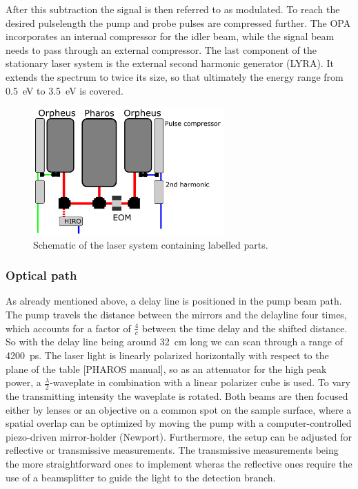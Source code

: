 After this subtraction the signal is then referred to as modulated.
To reach the desired pulselength the pump and probe pulses are compressed further.
The OPA incorporates an internal compressor for the idler beam, while the signal beam needs to pass through an external compressor.
The last component of the stationary laser system is the external second harmonic generator (LYRA).
It extends the spectrum to twice its size, so that ultimately the energy range from \qty{0.5}{eV} to \qty{3.5}{eV} is covered. 
\begin{figure}[ht]
    \centering
    \includegraphics[width=0.65\textwidth]{pictures/laser_system.png}
    \caption{Schematic of the laser system containing labelled parts.}
    \label{fig:laser_systems}
\end{figure}

\subsubsection*{Optical path}
As already mentioned above, a delay line is positioned in the pump beam path.
The pump travels the distance between the mirrors and the delayline four times, which accounts for a factor of $\frac{4}{c}$ between the time delay and the shifted distance.
So with the delay line being around \qty{32}{cm} long we can scan through a range of \qty{4200}{ps}.
The laser light is linearly polarized horizontally with respect to the plane of the table [PHAROS manual], so as an attenuator for the high peak power, a $\frac{\lambda}{2}$-waveplate in combination with a linear polarizer cube is used.
To vary the transmitting intensity the waveplate is rotated.
Both beams are then focused either by lenses or an objective on a common spot on the sample surface, where a spatial overlap can be optimized by moving the pump with a computer-controlled piezo-driven mirror-holder (Newport).
Furthermore, the setup can be adjusted for reflective or transmissive measurements.
The transmissive measurements being the more straightforward ones to implement wheras the reflective ones require the use of a beamsplitter to guide the light to the detection branch.

